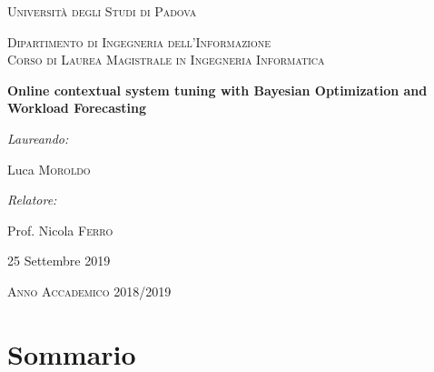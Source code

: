 \documentclass[a4paper]{article} %
\begin{document}
	
	\begin{titlepage}
		\centering
		\vspace*{1cm}
		{\par \scshape\LARGE Università degli Studi di Padova \par}
		\vspace{1cm}
		{\scshape\Large Dipartimento di Ingegneria dell'Informazione\\Corso di Laurea Magistrale in Ingegneria Informatica\par}
		\vspace{1.5cm}
		{\huge\bfseries Online contextual system tuning with Bayesian Optimization and Workload Forecasting\par}
		\vspace{2cm}
		{ \large \itshape Laureando:}
		{ \large Luca \textsc{Moroldo} \par}
		\vspace{0.7cm}
		{ \large \itshape Relatore:}
		{ \large Prof. Nicola \textsc{Ferro} \par}
		\vfill
		
		{ \large 25 Settembre 2019 \par}
		{ \large \textsc{Anno Accademico 2018/2019}\par}
	\end{titlepage}
	
	\clearpage%
	\thispagestyle{empty}%
	\addtocounter{page}{-1}%
	\null%
	\clearpage
	
	\newpage
	\thispagestyle{plain}
	\section*{Sommario}
	
\end{document}

